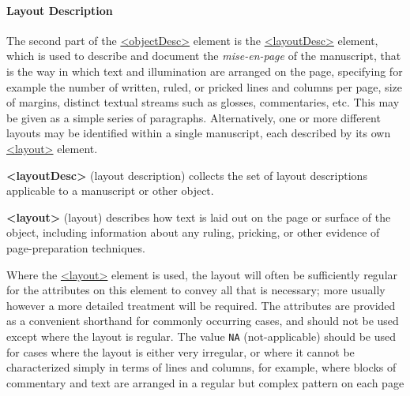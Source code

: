 \paragraph[{Layout Description}]{Layout Description}\label{msphla}\par
The second part of the \hyperref[TEI.objectDesc]{<objectDesc>} element is the \hyperref[TEI.layoutDesc]{<layoutDesc>} element, which is used to describe and document the \textit{mise-en-page} of the manuscript, that is the way in which text and illumination are arranged on the page, specifying for example the number of written, ruled, or pricked lines and columns per page, size of margins, distinct textual streams such as glosses, commentaries, etc. This may be given as a simple series of paragraphs. Alternatively, one or more different layouts may be identified within a single manuscript, each described by its own \hyperref[TEI.layout]{<layout>} element. 
\begin{sansreflist}
  
\item [\textbf{<layoutDesc>}] (layout description) collects the set of layout descriptions applicable to a manuscript or other object.
\item [\textbf{<layout>}] (layout) describes how text is laid out on the page or surface of the object, including information about any ruling, pricking, or other evidence of page-preparation techniques.
\end{sansreflist}
\par
Where the \hyperref[TEI.layout]{<layout>} element is used, the layout will often be sufficiently regular for the attributes on this element to convey all that is necessary; more usually however a more detailed treatment will be required. The attributes are provided as a convenient shorthand for commonly occurring cases, and should not be used except where the layout is regular. The value \texttt{NA} (not-applicable) should be used for cases where the layout is either very irregular, or where it cannot be characterized simply in terms of lines and columns, for example, where blocks of commentary and text are arranged in a regular but complex pattern on each page\par
